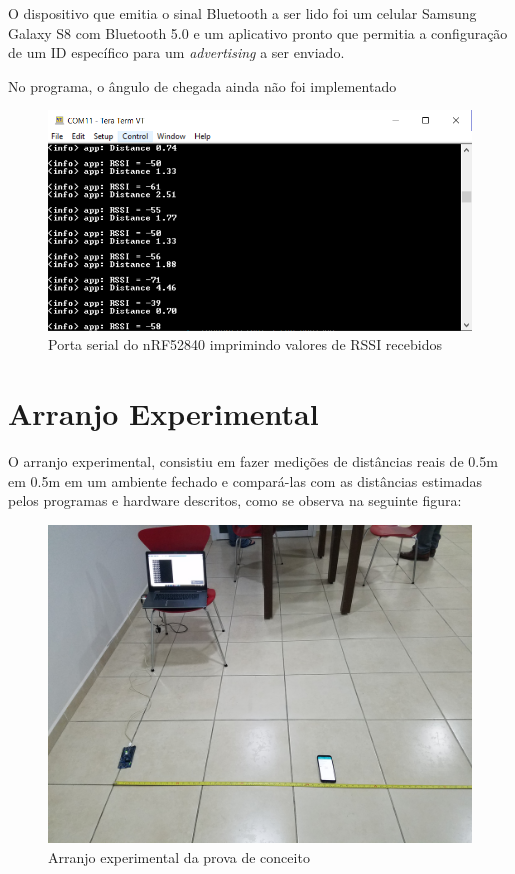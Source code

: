 O dispositivo que emitia o sinal Bluetooth a ser lido foi um celular Samsung Galaxy S8 com Bluetooth 5.0 e um aplicativo pronto que permitia a configuração de um ID específico para um \textit{advertising} a ser enviado.

No programa, o ângulo de chegada ainda não foi implementado

\begin{figure}[H]
	\centering 
	\includegraphics[scale = 0.85]{images/rssi_terminal.png}
	\caption{Porta serial do nRF52840 imprimindo valores de RSSI recebidos}
	\label{fig:rssi_terminal}
\end{figure}

\section{Arranjo Experimental}
O arranjo experimental, consistiu em fazer medições de distâncias reais de 0.5m em 0.5m em um ambiente fechado e compará-las com as distâncias estimadas pelos programas e hardware descritos, como se observa na seguinte figura:

\begin{figure}[H]
	\centering 
	\includegraphics[scale = 0.1]{images/setup_poc.jpg}
	\caption{Arranjo experimental da prova de conceito}
	\label{fig:setup_poc}
\end{figure}


